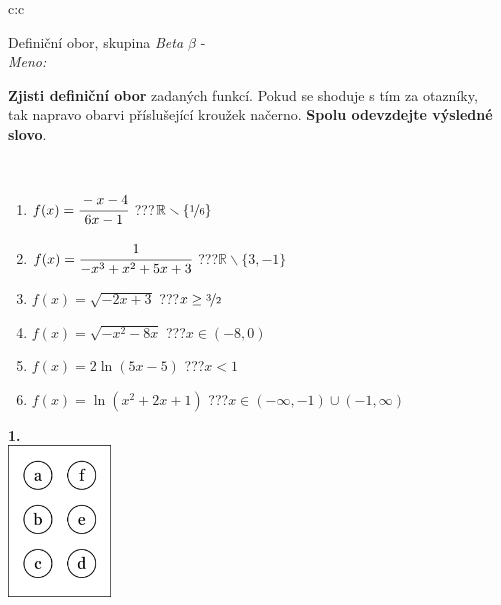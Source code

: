 \documentclass[10pt]{report}
\begin{document}
\begin{tabular}{c:c}
\begin{minipage}[c][104.5mm][t]{0.5\linewidth}
\begin{center}
\vspace{7mm}
{\huge Definiční obor, skupina \textit{Beta $\beta$} -}\\[5mm]
\textit{Meno:}\phantom{xxxxxxxxxxxxxxxxxxxxxxxxxxxxxxxxxxxxxxxxxxxxxxxxxxxxxxxxxxxxxxxxx}\\[5mm]
\begin{minipage}{0.95\linewidth}
\textbf{Zjisti definiční obor} zadaných funkcí. Pokud se shoduje s tím za otazníky,\\tak napravo obarvi příslušející kroužek načerno. \textbf{Spolu odevzdejte výsledné slovo}.
\end{minipage}
\\[1mm]
\begin{minipage}{0.79\linewidth}
\begin{center}
\begin{varwidth}{\linewidth}
\begin{enumerate}
\normalsizerrr
\item $f(x)=\cfrac{-x-4}{6x-1}$\quad \dotfill\; ???\;\dotfill \quad $\mathbb{R}\smallsetminus\{\nicefrac{1}{6}\}$
\item $f(x)=\cfrac{1}{-x^3+x^2+5x+3}$\quad \dotfill\; ???\;\dotfill \quad $\mathbb{R}\smallsetminus\{3,-1\}$
\item $f(x)=\sqrt{-2x+3}$\quad \dotfill\; ???\;\dotfill \quad $x\geq\nicefrac{3}{2}$
\item $f(x)=\sqrt{-x^2-8x}$\quad \dotfill\; ???\;\dotfill \quad $x\in(-8 , 0)$
\item $f(x)=2\ln{(5x-5)}$\quad \dotfill\; ???\;\dotfill \quad $x<1$
\item $f(x)=\ln{(x^2+2x+1)}$\quad \dotfill\; ???\;\dotfill \quad $x\in(-\infty , -1)\cup(-1 , \infty)$
\end{enumerate}
\end{varwidth}
\end{center}
\end{minipage}
\begin{minipage}{0.20\linewidth}
\begin{center}
{\Huge\bfseries 1.} \\[2mm]
\includegraphics[height=40mm]{../images/braille.png}

\end{center}
\end{minipage}
\end{center}
\end{minipage}
\end{tabular}
\end{document}
